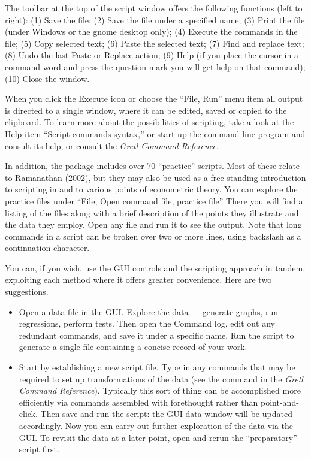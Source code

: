 The toolbar at the top of the script window offers the following
functions (left to right): (1) Save the file; (2) Save the file under
a specified name; (3) Print the file (under Windows or the gnome
desktop only); (4) Execute the commands in the file; (5) Copy selected
text; (6) Paste the selected text; (7) Find and replace text; (8) Undo
the last Paste or Replace action; (9) Help (if you place the cursor in
a command word and press the question mark you will get help on that
command); (10) Close the window.  

When you click the Execute icon or choose the ``File, Run'' menu item
all output is directed to a single window, where it can be edited,
saved or copied to the clipboard.  To learn more about the
possibilities of scripting, take a look at the  Help item
``Script commands syntax,'' or start up the command-line program
 and consult its help, or consult the \emph{Gretl
  Command Reference}.

In addition, the  package includes over 70 ``practice''
scripts.  Most of these relate to Ramanathan (2002), but they may also
be used as a free-standing introduction to scripting in 
and to various points of econometric theory.  You can explore the
practice files under ``File, Open command file, practice file'' There
you will find a listing of the files along with a brief description of
the points they illustrate and the data they employ.  Open any file
and run it to see the output.  Note that long commands in a script can
be broken over two or more lines, using backslash as a continuation
character.

You can, if you wish, use the GUI controls and the scripting approach
in tandem, exploiting each method where it offers greater convenience.
Here are two suggestions.

\begin{itemize}
\item Open a data file in the GUI.  Explore the data --- generate
  graphs, run regressions, perform tests.  Then open the Command log,
  edit out any redundant commands, and save it under a specific name.
  Run the script to generate a single file containing a concise record
  of your work.
\item Start by establishing a new script file.  Type in any commands
  that may be required to set up transformations of the data (see the
   command in the \emph{Gretl Command Reference}). Typically
  this sort of thing can be accomplished more efficiently via commands
  assembled with forethought rather than point-and-click. Then save
  and run the script: the GUI data window will be updated accordingly.
  Now you can carry out further exploration of the data via the GUI.
  To revisit the data at a later point, open and rerun the
  ``preparatory'' script first.
\end{itemize}


